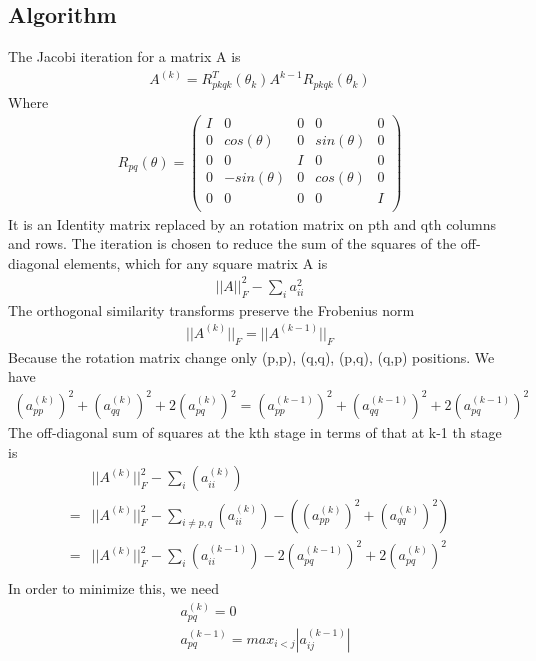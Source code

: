 \documentclass[a4paper]{article}
\begin{document}
\subsection{Algorithm}
The Jacobi iteration for a matrix A is
\begin{align*}
	A^{(k)} = R^T_{pkqk}(\theta_k) A^{k-1} R_{pkqk} (\theta_k)
\end{align*}
Where
\begin{align*}
	R_{pq}(\theta)
	= 
	\left( \begin{array}{ccccc}
I      & 	0 	& 	0 	 & 	 0 		& 	0 	\\
0	   & 	cos(\theta) 	& 	0 	 &	 sin(\theta) 		& 	0	\\
0 	   &    0   &   I  	 &   0		&	0	\\
0 	   &    -sin(\theta)   &   0    &   cos(\theta)		& 	0	\\
0      &    0   &   0    & 	 0   	& 	I	\\\end{array} \right)
\end{align*}
It is an Identity matrix replaced by an rotation matrix on pth and qth columns and rows. The iteration is chosen to reduce the sum of the squares of the off-diagonal elements, which for any square matrix A is
\begin{align*}
	||A||_F^2 - \sum_i a_{ii}^2
\end{align*}
The orthogonal similarity transforms preserve the Frobenius norm
\begin{align*}
	|| A^{(k)}||_F = ||A^{(k-1)}||_F
\end{align*}
Because the rotation matrix change only (p,p), (q,q), (p,q), (q,p) positions. We have
\begin{align*}
	(a_{pp}^{(k)})^2 + (a_{qq}^{(k)})^2+ 2 (a_{pq}^{(k)})^2 = (a_{pp}^{(k-1)})^2 + (a_{qq}^{(k-1)})^2 + 2 (a_{pq}^{(k-1)})^2   
\end{align*}
The off-diagonal sum of squares at the kth stage in terms of that at k-1 th stage is
\begin{align*}
	& || A^{(k)}||^2_F - \sum_i (a_{ii}^{(k)}) \\
	= & || A^{(k)}||^2_F - \sum_{i \neq p,q} (a_{ii}^{(k)}) -( (a_{pp}^{(k)})^2 + (a_{qq}^{(k)})^2 ) \\
	= & || A^{(k)}||^2_F - \sum_i (a_{ii}^{(k-1)}) - 2 (a_{pq}^{(k-1)})^2  + 2 (a_{pq}^{(k)})^2  \\
\end{align*}
In order to minimize this, we need
\begin{align*}
	& a_{pq}^{(k)} = 0\\
	& a_{pq}^{(k-1)} = max _{i<j} |a_{ij} ^ {(k-1)}|\\
\end{align*}
\end{document}
